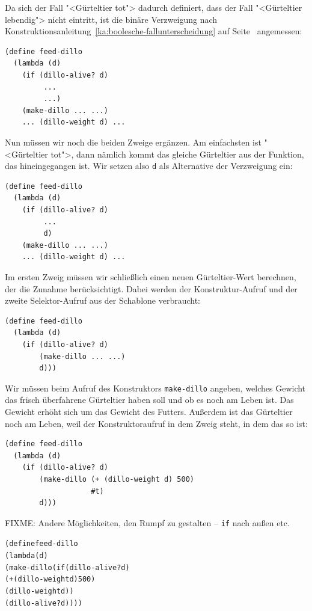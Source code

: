 Da sich der Fall "<Gürteltier tot"> dadurch definiert, dass der
Fall "<Gürteltier lebendig"> nicht eintritt, ist die binäre Verzweigung
nach Konstruktionsanleitung~\ref{ka:boolesche-fallunterscheidung} auf
Seite~\pageref{ka:boolesche-fallunterscheidung} angemessen:
%
\begin{verbatim}
(define feed-dillo
  (lambda (d)
    (if (dillo-alive? d)
         ...
         ...)
    (make-dillo ... ...)
    ... (dillo-weight d) ...
\end{verbatim}
%
Nun müssen wir noch die beiden Zweige ergänzen.  Am
einfachsten ist "<Gürteltier tot">, dann nämlich kommt
das gleiche Gürteltier aus der Funktion, das hineingegangen ist.  Wir
setzen also \texttt{d} als Alternative der Verzweigung ein:
%
\begin{verbatim}
(define feed-dillo
  (lambda (d)
    (if (dillo-alive? d)
         ...
         d)
    (make-dillo ... ...)
    ... (dillo-weight d) ...
\end{verbatim}
%
Im ersten Zweig müssen wir schließlich einen neuen Gürteltier-Wert
berechnen, der die Zunahme berücksichtigt.  Dabei werden der
Konstruktur-Aufruf und der zweite Selektor-Aufruf aus der Schablone
verbraucht:
\begin{verbatim}
(define feed-dillo
  (lambda (d)
    (if (dillo-alive? d)
        (make-dillo ... ...)
        d)))
\end{verbatim}
%
Wir müssen beim Aufruf des Konstruktors \texttt{make-dillo} angeben,
welches Gewicht das frisch überfahrene Gürteltier haben soll und ob es
noch am Leben ist.  Das Gewicht erhöht sich um das Gewicht des
Futters.  Außerdem ist das Gürteltier noch am Leben, weil der
Konstruktoraufruf in dem Zweig steht, in dem das so ist:
%
\begin{verbatim}
(define feed-dillo
  (lambda (d)
    (if (dillo-alive? d)
        (make-dillo (+ (dillo-weight d) 500)
                    #t)
        d)))
\end{verbatim}
%
FIXME: Andere Möglichkeiten, den Rumpf zu gestalten -- \texttt{if}
nach außen etc.

\begin{alltt}
(define feed-dillo
  (lambda (d)
    (make-dillo (if (dillo-alive? d)
                    (+ (dillo-weight d) 500)
                    (dillo-weight d))
                (dillo-alive? d))))
\end{alltt}

